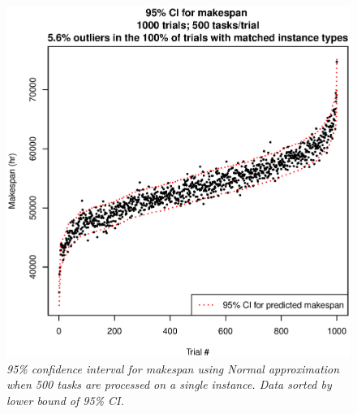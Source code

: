 \documentclass[12pt]{report}
\begin{document}
\begin{figure}
\includegraphics[width=1\textwidth]{validate-stochastic-runtimes-1000-trials-500-tasks.eps}
\caption{\textit{95\% confidence interval for makespan using Normal approximation when 500 tasks are processed on a single instance. Data sorted by lower bound of 95\% CI.}}
\label{fig:validate-stochastic-runtimes-1000-trials-500-tasks}
\end{figure}
\end{document}
